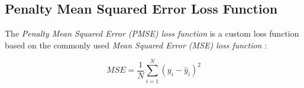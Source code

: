   \subsection{Penalty Mean Squared Error Loss Function}
  \label{sec:penalty-mse-loss-function-architecture-and-implementation}

    The \emph{Penalty Mean Squared Error (PMSE) loss function} is a custom loss function based on the commonly used \emph{Mean Squared Error (MSE) loss function} \cite{koksoyMultiresponseRobustDesign2006}:

    $$MSE = \frac{1}{N} \sum_{i = 1}^{N}\left(y_i - \hat{y}_i\right)^2$$

    


